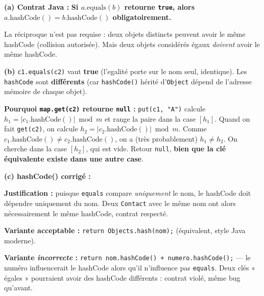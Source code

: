 \documentclass[10pt,a4paper]{article}
\newcommand{\cor}[1]{{\color{corrcolor}\textbf{#1}}}
\newcommand{\corm}[1]{{\color{corrcolor}#1}}
\begin{document}
\vspace{0.15cm}

\textbf{(a) Contrat Java :} \cor{Si $a.\text{equals}(b)$ retourne \texttt{true}, alors $a.\text{hashCode}() = b.\text{hashCode}()$ obligatoirement.}

\medskip

\corm{La réciproque n'est pas requise : deux objets distincts peuvent avoir le même hashCode (collision autorisée). Mais deux objets considérés égaux \emph{doivent} avoir le même hashCode.}

\vspace{0.2cm}

\textbf{(b)} \texttt{c1.equals(c2)} vaut \cor{true} (l'egalité porte sur le nom seul, identique). Les \texttt{hashCode} sont \cor{différents} (car \texttt{hashCode()} hérité d'\texttt{Object} dépend de l'adresse mémoire de chaque objet).

\medskip

\corm{\textbf{Pourquoi \texttt{map.get(c2)} retourne \texttt{null} :}
\texttt{put(c1, "A")} calcule $h_1 = |c_1.\text{hashCode}()| \bmod m$ et range la paire dans la case $[h_1]$.
Quand on fait \texttt{get(c2)}, on calcule $h_2 = |c_2.\text{hashCode}()| \bmod m$. Comme $c_1.\text{hashCode}() \neq c_2.\text{hashCode}()$, on a (très probablement) $h_1 \neq h_2$. On cherche dans la case $[h_2]$, qui est vide. Retour \texttt{null}, \textbf{bien que la clé équivalente existe dans une autre case}.}

\vspace{0.2cm}

\textbf{(c) hashCode() corrigé :}

\begin{center}
\end{center}

\medskip

\corm{\textbf{Justification :} puisque \texttt{equals} compare \emph{uniquement} le nom, le hashCode doit dépendre uniquement du nom. Deux \texttt{Contact} avec le même nom ont alors nécessairement le même hashCode, contrat respecté.

\medskip
\textbf{Variante acceptable :} \texttt{return Objects.hash(nom);} (équivalent, style Java moderne).

\medskip
\textbf{Variante \emph{incorrecte} :} \texttt{return nom.hashCode() + numero.hashCode();} --- le numéro influencerait le hashCode alors qu'il n'influence pas \texttt{equals}. Deux clés « égales » pourraient avoir des hashCode différents : contrat violé, même bug qu'avant.}
\end{document}

